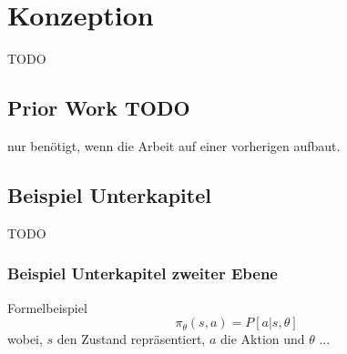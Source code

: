 \chapter{Konzeption}
TODO

\section{Prior Work TODO}
nur benötigt, wenn die Arbeit auf einer vorherigen aufbaut.\cite{Sutton:1998:IRL:551283}

\section{Beispiel Unterkapitel}
TODO

\subsection{Beispiel Unterkapitel zweiter Ebene}
Formelbeispiel
\begin{equation}
	\pi_\theta(s, a) = P [a | s, \theta]
\end{equation}
wobei, $s$ den Zustand repräsentiert, $a$ die Aktion und $\theta$ ...